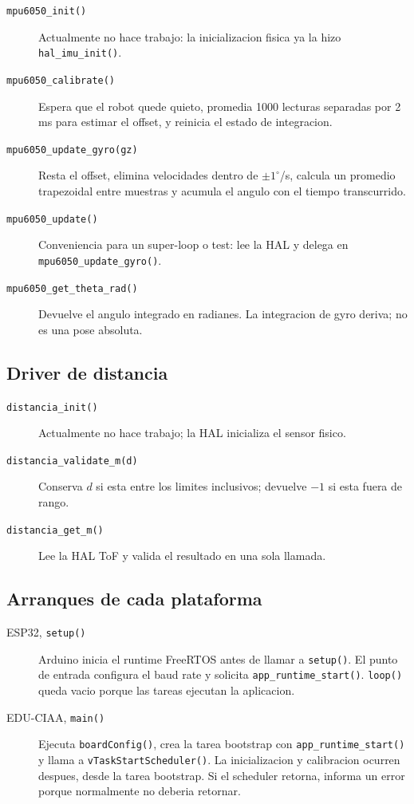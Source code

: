 \documentclass[11pt,a4paper]{article}
\begin{document}
\begin{description}
  \item[\texttt{mpu6050\_init()}] Actualmente no hace trabajo: la
        inicializacion fisica ya la hizo \texttt{hal\_imu\_init()}.
  \item[\texttt{mpu6050\_calibrate()}] Espera que el robot quede quieto,
        promedia 1000 lecturas separadas por 2 ms para estimar el offset, y
        reinicia el estado de integracion.
  \item[\texttt{mpu6050\_update\_gyro(gz)}] Resta el offset, elimina velocidades
        dentro de $\pm1^\circ$/s, calcula un promedio trapezoidal entre muestras
        y acumula el angulo con el tiempo transcurrido.
  \item[\texttt{mpu6050\_update()}] Conveniencia para un super-loop o test:
        lee la HAL y delega en \texttt{mpu6050\_update\_gyro()}.
  \item[\texttt{mpu6050\_get\_theta\_rad()}] Devuelve el angulo integrado en
        radianes. La integracion de gyro deriva; no es una pose absoluta.
\end{description}

\subsection{Driver de distancia}

\begin{description}
  \item[\texttt{distancia\_init()}] Actualmente no hace trabajo; la HAL
        inicializa el sensor fisico.
  \item[\texttt{distancia\_validate\_m(d)}] Conserva $d$ si esta entre los
        limites inclusivos; devuelve $-1$ si esta fuera de rango.
  \item[\texttt{distancia\_get\_m()}] Lee la HAL ToF y valida el resultado en
        una sola llamada.
\end{description}

\subsection{Arranques de cada plataforma}

\begin{description}
  \item[ESP32, \texttt{setup()}] Arduino inicia el runtime FreeRTOS antes de
        llamar a \texttt{setup()}. El punto de entrada configura el baud rate y
        solicita \texttt{app\_runtime\_start()}. \texttt{loop()} queda vacio
        porque las tareas ejecutan la aplicacion.
  \item[EDU-CIAA, \texttt{main()}] Ejecuta \texttt{boardConfig()}, crea la tarea
        bootstrap con \texttt{app\_runtime\_start()} y llama a
        \texttt{vTaskStartScheduler()}. La inicializacion y calibracion ocurren
        despues, desde la tarea bootstrap. Si el scheduler retorna, informa un
        error porque normalmente no deberia retornar.
\end{description}
\end{document}
